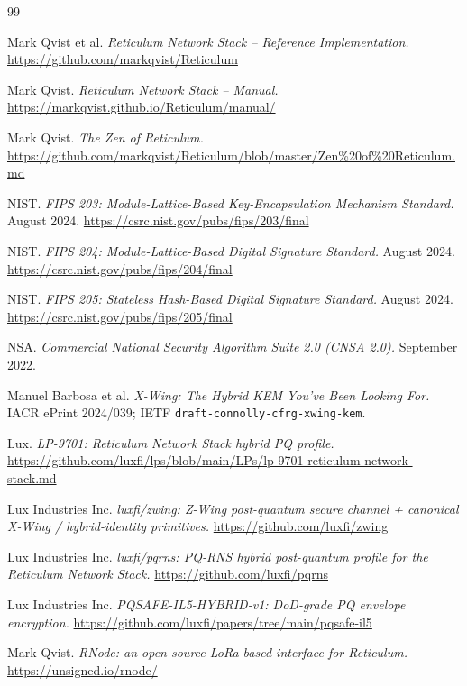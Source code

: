\documentclass[11pt,a4paper]{article}
\begin{document}
\begin{thebibliography}{99}

Mark Qvist et al. \emph{Reticulum Network Stack -- Reference
Implementation.} \url{https://github.com/markqvist/Reticulum}

Mark Qvist. \emph{Reticulum Network Stack -- Manual.}
\url{https://markqvist.github.io/Reticulum/manual/}

Mark Qvist. \emph{The Zen of Reticulum.}
\url{https://github.com/markqvist/Reticulum/blob/master/Zen\%20of\%20Reticulum.md}

NIST. \emph{FIPS 203: Module-Lattice-Based Key-Encapsulation Mechanism
Standard.} August 2024.
\url{https://csrc.nist.gov/pubs/fips/203/final}

NIST. \emph{FIPS 204: Module-Lattice-Based Digital Signature Standard.}
August 2024.
\url{https://csrc.nist.gov/pubs/fips/204/final}

NIST. \emph{FIPS 205: Stateless Hash-Based Digital Signature Standard.}
August 2024.
\url{https://csrc.nist.gov/pubs/fips/205/final}

NSA. \emph{Commercial National Security Algorithm Suite 2.0
(CNSA 2.0).} September 2022.

Manuel Barbosa et al. \emph{X-Wing: The Hybrid KEM You've Been Looking
For.} IACR ePrint 2024/039;
IETF \texttt{draft-connolly-cfrg-xwing-kem}.

Lux. \emph{LP-9701: Reticulum Network Stack hybrid PQ profile.}
\url{https://github.com/luxfi/lps/blob/main/LPs/lp-9701-reticulum-network-stack.md}

Lux Industries Inc. \emph{luxfi/zwing: Z-Wing post-quantum secure
channel + canonical X-Wing / hybrid-identity primitives.}
\url{https://github.com/luxfi/zwing}

Lux Industries Inc. \emph{luxfi/pqrns: PQ-RNS hybrid post-quantum
profile for the Reticulum Network Stack.}
\url{https://github.com/luxfi/pqrns}

Lux Industries Inc. \emph{PQSAFE-IL5-HYBRID-v1: DoD-grade PQ envelope
encryption.}
\url{https://github.com/luxfi/papers/tree/main/pqsafe-il5}

Mark Qvist. \emph{RNode: an open-source LoRa-based interface for
Reticulum.} \url{https://unsigned.io/rnode/}

\end{thebibliography}
\end{document}

